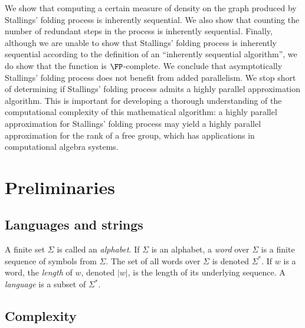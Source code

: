 \documentclass{article}
\begin{document}
%
We show that computing a certain measure of density on the graph produced by Stallings' folding process is inherently sequential.
We also show that counting the number of redundant steps in the process is inherently sequential.
Finally, although we are unable to show that Stallings' folding process is inherently sequential according to the definition of an ``inherently sequential algorithm'', we do show that the function is $\FP$-complete.
We conclude that asymptotically Stallings' folding process does not benefit from added parallelism.
We stop short of determining if Stallings' folding process admits a highly parallel approximation algorithm.
This is important for developing a thorough understanding of the computational complexity of this mathematical algorithm: a highly parallel approximation for Stallings' folding process may yield a highly parallel approximation for the rank of a free group, which has applications in computational algebra systems.

\section{Preliminaries}

\subsection{Languages and strings}

A finite set $\Sigma$ is called an \emph{alphabet}.
If $\Sigma$ is an alphabet, a \emph{word} over $\Sigma$ is a finite sequence of symbols from $\Sigma$.
The set of all words over $\Sigma$ is denoted $\Sigma^*$.
If $w$ is a word, the \emph{length} of $w$, denoted $|w|$, is the length of its underlying sequence.
A \emph{language} is a subset of $\Sigma^*$.

\subsection{Complexity}
\end{document}
